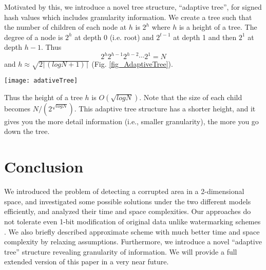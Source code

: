 \documentclass{llncs}
\begin{document}
Motivated by this, we introduce a novel tree structure, ``adaptive tree'', 
for signed hash values which includes granularity information.
We create a tree such that the number of children of each node at $h$ is $2^h$ 
where $h$ is a height of a tree.
The degree of a node is $2^h$ at depth 0 (i.e. root) and $2^{t-1}$ at depth 1 and then 
$2^1$ at depth $h-1$. Thus $$2^h 2^{h-1} 2^{h-2} \cdots 2^1 = N$$ and 
$h \approx  \sqrt{2 \lceil (log N + 1 ) \rceil }$ (Fig. \ref{fig_AdaptiveTree}).

\begin{figure*}[htp]
\centering
{\texttt{[image: adativeTree]}}
\caption{Adaptive Tree (e.g.,$N = 64$)}
\label{fig_AdaptiveTree}
\end{figure*}

Thus the height of a tree $h$ is $O( \sqrt{log N} )$.
Note that the size of each child becomes $N / (2^{\sqrt{log N}})$. 
This adaptive tree structure has a shorter height, 
and it gives you the more detail information (i.e., smaller granularity),
the more you go down the tree.


\section{Conclusion}
\label{Conclusion}

We introduced the problem of detecting a corrupted area in a 2-dimensional space,
and investigated some possible solutions under the two different models efficiently, 
and analyzed their time and space complexities.
Our approaches do not tolerate even 1-bit modification of original data unlike watermarking schemes \cite{ZaMu07}.
We also briefly described approximate scheme with much better time and space complexity by relaxing assumptions.
Furthermore, we introduce a novel ``adaptive tree'' structure revealing granularity of information.
We will provide a full extended version of this paper in a very near future.



\end{document}
